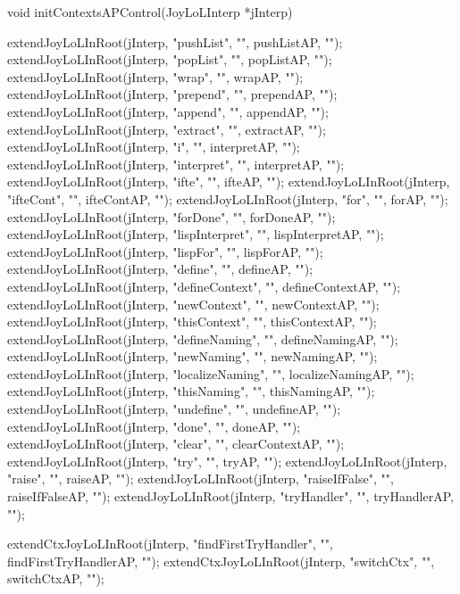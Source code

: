 \startCCode
void initContextsAPControl(JoyLoLInterp *jInterp) {
  extendJoyLoLInRoot(jInterp, "pushList",       "", pushListAP,       "");
  extendJoyLoLInRoot(jInterp, "popList",        "", popListAP,        "");
  extendJoyLoLInRoot(jInterp, "wrap",           "", wrapAP,           "");
  extendJoyLoLInRoot(jInterp, "prepend",        "", prependAP,        "");
  extendJoyLoLInRoot(jInterp, "append",         "", appendAP,         "");
  extendJoyLoLInRoot(jInterp, "extract",        "", extractAP,        "");
  extendJoyLoLInRoot(jInterp, "i",              "", interpretAP,      "");
  extendJoyLoLInRoot(jInterp, "interpret",      "", interpretAP,      "");
  extendJoyLoLInRoot(jInterp, "ifte",           "", ifteAP,           "");
  extendJoyLoLInRoot(jInterp, "ifteCont",       "", ifteContAP,       "");
  extendJoyLoLInRoot(jInterp, "for",            "", forAP,            "");
  extendJoyLoLInRoot(jInterp, "forDone",        "", forDoneAP,        "");
  extendJoyLoLInRoot(jInterp, "lispInterpret",  "", lispInterpretAP,  "");
  extendJoyLoLInRoot(jInterp, "lispFor",        "", lispForAP,        "");
  extendJoyLoLInRoot(jInterp, "define",         "", defineAP,         "");
  extendJoyLoLInRoot(jInterp, "defineContext",  "", defineContextAP,  "");
  extendJoyLoLInRoot(jInterp, "newContext",     "", newContextAP,     "");
  extendJoyLoLInRoot(jInterp, "thisContext",    "", thisContextAP,    "");
  extendJoyLoLInRoot(jInterp, "defineNaming",   "", defineNamingAP,   "");
  extendJoyLoLInRoot(jInterp, "newNaming",      "", newNamingAP,      "");
  extendJoyLoLInRoot(jInterp, "localizeNaming", "", localizeNamingAP, "");
  extendJoyLoLInRoot(jInterp, "thisNaming",     "", thisNamingAP,     "");
  extendJoyLoLInRoot(jInterp, "undefine",       "", undefineAP,       "");
  extendJoyLoLInRoot(jInterp, "done",           "", doneAP,           "");
  extendJoyLoLInRoot(jInterp, "clear",          "", clearContextAP,   "");
  extendJoyLoLInRoot(jInterp, "try",            "", tryAP,            "");
  extendJoyLoLInRoot(jInterp, "raise",          "", raiseAP,          "");
  extendJoyLoLInRoot(jInterp, "raiseIfFalse",   "", raiseIfFalseAP,   "");
  extendJoyLoLInRoot(jInterp, "tryHandler",     "", tryHandlerAP,     "");
  
  extendCtxJoyLoLInRoot(jInterp, "findFirstTryHandler", "", findFirstTryHandlerAP, "");
  extendCtxJoyLoLInRoot(jInterp, "switchCtx",           "", switchCtxAP,           "");
}
\stopCCode